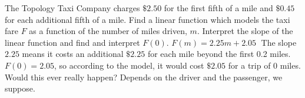 {The Topology Taxi Company charges $\$2.50$ for the first fifth of a mile and $\$0.45$ for each additional fifth of a mile.  Find a linear function which models the taxi fare $F$ as a function of the number of miles driven, $m$.  Interpret the slope of the linear function and find and interpret $F(0)$.}
{$F(m) = 2.25m + 2.05 \;$  The slope $2.25$ means it costs an additional $\$2.25$ for each mile beyond the first 0.2 miles.  $F(0) = 2.05$, so according to the model, it would cost $\$2.05$ for a trip of $0$ miles.  Would this ever really happen?  Depends on the driver and the passenger, we suppose.}